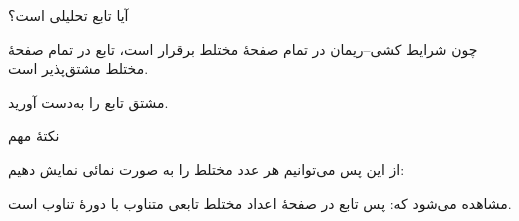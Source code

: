 \begin{EMexample}{}

آیا تابع  تحلیلی است؟

چون شرایط کشی--ریمان در تمام صفحهٔ مختلط برقرار است، تابع  در تمام صفحهٔ مختلط مشتق‌پذیر است.

\end{EMexample}

\begin{EMexample}{}

مشتق تابع  را به‌دست آورید.


\end{EMexample}

\begin{EMimportant}{نکتهٔ مهم}

از این پس می‌توانیم هر عدد مختلط را به صورت نمائی نمایش دهیم:

\end{EMimportant}

\begin{EMunit}

مشاهده می‌شود که:
پس تابع  در صفحهٔ اعداد مختلط تابعی متناوب با دورهٔ تناوب  است.


\end{EMunit}

\EMhold


\begin{EMunit}


\end{EMunit}

